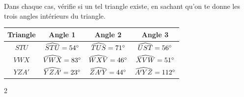 \documentclass[a4paper,11pt]{report}
\begin{document}
\begin{exo}
{Dans chaque cas, vérifie si un tel triangle existe, en sachant qu'on te donne les trois angles intérieurs du triangle.
\begin{center}
\begin{tabular}{|c|c|c|c|}\hline
{\bf Triangle} & {\bf Angle 1} & {\bf Angle 2} & {\bf Angle 3} \\\hline
$STU$ & $\widehat{STU}=54^\circ$ & $\widehat{TUS}=71^\circ$ & $\widehat{UST}=56^\circ$ \\\hline
$VWX$ & $\widehat{VWX}=83^\circ$ & $\widehat{WXV}=46^\circ$ & $\widehat{XVW}=51^\circ$ \\\hline
$YZA'$ & $\widehat{YZA'}=23^\circ$ & $\widehat{ZA'Y}=44^\circ$ & $\widehat{A'YZ}=112^\circ$ \\\hline
\end{tabular}
\end{center}
\vspace{-0.3cm}}{2}
\end{exo}
\end{document}
